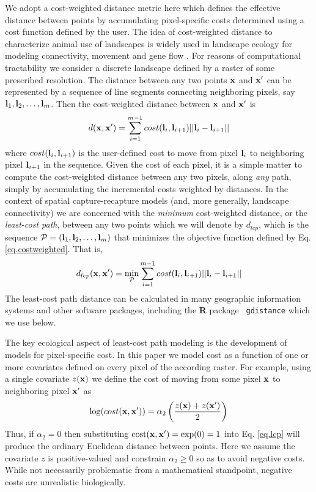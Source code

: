 We adopt a cost-weighted distance metric here which defines the
effective distance between points by accumulating pixel-specific costs
determined using a cost function defined by the user.  The idea of
cost-weighted distance to characterize animal use of landscapes is
widely used in landscape ecology for modeling connectivity, movement
and gene flow \citep{beier_etal:2008}. For reasons of computational
tractability we consider a discrete landscape defined by a raster of
some prescribed resolution. The distance between any two points ${\bf
  x}$ and ${\bf x}'$ can be represented by a sequence of line segments
connecting neighboring pixels, say ${\bf l}_{1},{\bf
  l}_{2},\ldots,{\bf l}_{m}$. Then the cost-weighted distance between
${\bf x}$ and ${\bf x}'$ is
\begin{equation}
 d({\bf x},{\bf x}')
  =  \sum_{i=1}^{m-1} cost({\bf l}_{i},{\bf l}_{i+1})||{\bf l}_{i} - {\bf l}_{i+1}||
\label{eq.costweighted}
\end{equation}
where $cost({\bf l}_{i},{\bf l}_{i+1})$ is the user-defined cost to
move from pixel ${\bf l}_{i}$ to neighboring pixel ${\bf l}_{i+1}$ in
the sequence.  Given the cost of each pixel, it is a simple matter to
compute the cost-weighted distance between any two pixels, along {\it
  any} path, simply by accumulating the incremental costs weighted by
distances.  In the context of spatial capture-recapture models (and,
more generally, landscape connectivity) we are concerned with the {\it
  minimum} cost-weighted distance, or the {\it least-cost path},
between any two points which we will denote by $d_{lcp}$, which is the
sequence ${\cal P} = ({\bf l}_{1},{\bf l}_{2},\ldots,{\bf l}_{m})$
that minimizes the objective function defined by
Eq. \ref{eq.costweighted}. That is,
\begin{equation}
 d_{lcp}({\bf x},{\bf x}')
  =  \min_{{\cal P}} \sum_{i=1}^{m-1} cost({\bf l}_{i},{\bf l}_{i+1})||{\bf l}_{i} - {\bf l}_{i+1}||
\label{eq.lcp}
\end{equation}
The least-cost path distance can be calculated in
 many geographic information systems and other software packages,
including the {\bf R} package \mbox{\tt
  gdistance} \citep{vanetten:2011} which we use below.

The key ecological aspect of least-cost path modeling is the
development
of models for pixel-specific cost.
In this paper we model cost as a function of one or more covariates
defined on every pixel of the according raster. For example, using a
single covariate $z({\bf x})$ we define the cost of moving from some pixel
${\bf x}$ to neighboring pixel ${\bf x}'$ as
\begin{equation}
\log(  cost({\bf x},{\bf x}'))=  \alpha_{2}\left( \frac{z({\bf
      x})+z({\bf x}')}{2}
\right)
\label{ecoldist.eq.cost}
\end{equation}
Thus, if $\alpha_{2} = 0$ then substituting $\mbox{cost}({\bf x},{\bf x}')
=\exp(0) = 1$ into
Eq. \ref{eq.lcp} will produce the ordinary Euclidean distance
between points. Here we assume the covariate $z$ is positive-valued
and constrain $\alpha_{2}\ge 0$ so as to avoid
negative costs. While not necessarily problematic from a mathematical
standpoint, negative costs are unrealistic biologically. 

